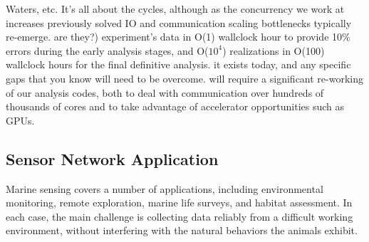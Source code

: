 \documentclass[times]{cpeauth}
\begin{document}
Waters, etc. It's all about the cycles, although as the concurrency we work at
increases previously solved IO and communication scaling bottlenecks typically
re-emerge.
%
%
%
%
%
%
%
%
%
%
%
are they?)
%
experiment's data in O(1) wallclock hour to provide 10\% errors during the early
analysis stages, and O($10^4$) realizations in O(100) wallclock hours for the
final definitive analysis.
%
it exists today, and any specific gaps that you know will need to be overcome.
%
will require a significant re-working of our analysis codes, both to deal with
communication over hundreds of thousands of cores and to take advantage of
accelerator opportunities such as GPUs.



\subsection{Sensor Network Application \label{sensorSimon}}

%




Marine sensing covers a number of applications, including environmental
monitoring, remote exploration, marine life surveys, and habitat assessment. In
each case, the main challenge is collecting data reliably from a difficult
working environment, without interfering with the natural behaviors the animals
exhibit.
\end{document}
